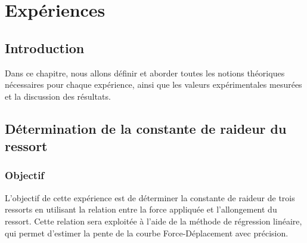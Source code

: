 \section{Expériences}
    \subsection{Introduction}
    Dans ce chapitre, nous allons définir et aborder toutes les notions théoriques nécessaires
    pour chaque expérience, ainsi que les valeurs expérimentales mesurées et la discussion des résultats.

    \subsection{Détermination de la constante de raideur du ressort}
        \subsubsection{Objectif}
        L’objectif de cette expérience est de déterminer la constante de raideur de trois ressorts en utilisant 
        la relation entre la force appliquée et l’allongement du ressort. Cette relation sera exploitée 
        à l’aide de la méthode de régression linéaire, qui permet d’estimer la pente de la courbe Force-Déplacement avec précision.
